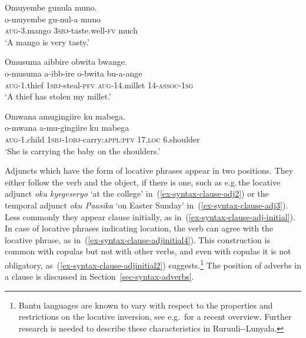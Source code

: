 \ea \label{ex-syntax-clause}
\begin{xlist}	
\ex   \label{ex-syntax-clause-intr}
    \glll    Omuyembe gunula muno.\\
     o-muyembe gu-nul-a muno\\
	\textsc{aug}-3.mango \textsc{3sbj}-taste.well-\textsc{fv} much\\
    \glt  `A mango is very tasty.’

\ex   \label{ex-syntax-clause-tr}
    \glll   Omusuma aibbire obwita bwange.\\
      o-musuma a-ibb-ire o-bwita bu-a-ange\\
	\textsc{aug}-1.thief \textsc{1sbj}-steal-\textsc{pfv} \textsc{aug}-14.millet 14-\textsc{assoc}-\textsc{1sg}\\
    \glt  `A thief has stolen my millet.’
    
 \ex   \label{ex-syntax-clause-fronted}
    \glll  Omwana amugingiire ku mabega.\\
      o-mwana a-mu-gingiire ku mabega\\
	\textsc{aug}-1.child \textsc{1sbj}-\textsc{1obj}-carry:\textsc{appl:pfv} 17.\textsc{loc} 6.shoulder\\
    \glt  `She is carrying the baby on the shoulders.’
\end{xlist}	
\z

Adjuncts which have the form of locative phrases appear in two positions. 
They either follow the verb and the object, if there is one, such as e.g.\,the locative adjunct \emph{oku kyegeseryo} `at the college' in~(\ref{ex-syntax-clause-adj2}) or the temporal adjunct \emph{oku Paasika} `on Easter Sunday' in~(\ref{ex-syntax-clause-adj3}). 
Less commonly they appear clause initially, as in~(\ref{ex-syntax-clause-adj-initial}). 
In case of locative phrases indicating location, the verb can agree with the locative phrase, as in~(\ref{ex-syntax-clause-adjinitial4}). 
This construction is common with copulas but not with other verbs, and even with copulas it is not obligatory, as~(\ref{ex-syntax-clause-adjinitial2}) suggests.\footnote{Bantu languages are known to vary with respect to the properties and restrictions on the locative inversion, see e.g.\,\citet{Salzmann2011Towards} for a recent overview. Further research is needed to describe these characteristics in Ruruuli\hyp{}-Lunyala.}
The position of adverbs in a clause is discussed in Section~\ref{sec-syntax-adverbs}.


